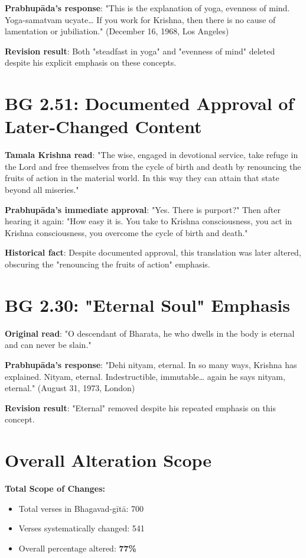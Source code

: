 \documentclass[11pt,twoside]{book}
\begin{document}
\textbf{\textbf{Prabhupāda's response}}: "This is the explanation of yoga, evenness of mind. Yoga-samatvam ucyate\ldots{} If you work for Krishna, then there is no cause of lamentation or jubiliation." (December 16, 1968, Los Angeles)

\textbf{\textbf{Revision result}}: Both "steadfast in yoga" and "evenness of mind" deleted despite his explicit emphasis on these concepts.
\section*{BG 2.51: Documented Approval of Later-Changed Content}
\label{sec:orgbdf0aa5}
\textbf{\textbf{Tamala Krishna read}}: "The wise, engaged in devotional service, take refuge in the Lord and free themselves from the cycle of birth and death by renouncing the fruits of action in the material world. In this way they can attain that state beyond all miseries."

\textbf{\textbf{Prabhupāda's immediate approval}}: "Yes. There is purport?" Then after hearing it again: "How easy it is. You take to Krishna consciousness, you act in Krishna consciousness, you overcome the cycle of birth and death."

\textbf{\textbf{Historical fact}}: Despite documented approval, this translation was later altered, obscuring the "renouncing the fruits of action" emphasis.
\section*{BG 2.30: "Eternal Soul" Emphasis}
\label{sec:org4780e51}
\textbf{\textbf{Original read}}: "O descendant of Bharata, he who dwells in the body is eternal and can never be slain."

\textbf{\textbf{Prabhupāda's response}}: "Dehi nityam, eternal. In so many ways, Krishna has explained. Nityam, eternal. Indestructible, immutable\ldots{} again he says nityam, eternal." (August 31, 1973, London)

\textbf{\textbf{Revision result}}: "Eternal" removed despite his repeated emphasis on this concept.
\section*{Overall Alteration Scope}
\label{sec:orgaf5c094}

\textbf{\textbf{Total Scope of Changes:}}
\begin{itemize}
\item Total verses in Bhagavad-gītā: 700
\item Verses systematically changed: 541
\item Overall percentage altered: \textbf{\textbf{77\%}}
\end{itemize}
\end{document}
